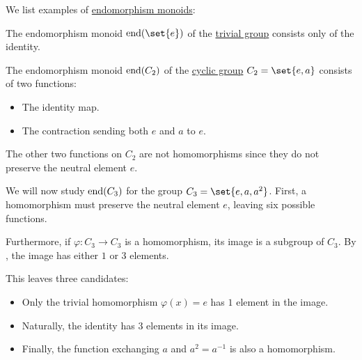 \begin{example}\label{ex:def:endomorphism_monoid}
  We list examples of \hyperref[def:endomorphism_monoid]{endomorphism monoids}:
  \begin{thmenum}
     The endomorphism monoid \( \End(\set{ e }) \) of the \hyperref[def:group/trivial]{trivial group} consists only of the identity.

     The endomorphism monoid \( \operatorname{end}(C_2) \) of the \hyperref[def:cyclic_group]{cyclic group} \( C_2 = \set{ e, a } \) consists of two functions:
    \begin{itemize}
      \item The identity map.
      \item The contraction sending both \( e \) and \( a \) to \( e \).
    \end{itemize}

    The other two functions on \( C_2 \) are not homomorphisms since they do not preserve the neutral element \( e \).

     We will now study \( \operatorname{end}(C_3) \) for the group \( C_3 = \set{ e, a, a^2 } \). First, a homomorphism must preserve the neutral element \( e \), leaving six possible functions.

    Furthermore, if \( \varphi: C_3 \to C_3 \) is a homomorphism, its image is a subgroup of \( C_3 \). By , the image has either \( 1 \) or \( 3 \) elements.

    This leaves three candidates:
    \begin{itemize}
      \item Only the trivial homomorphism \( \varphi(x) = e \) has \( 1 \) element in the image.
      \item Naturally, the identity has \( 3 \) elements in its image.
      \item Finally, the function exchanging \( a \) and \( a^2 = a^{-1} \) is also a homomorphism.
    \end{itemize}
  \end{thmenum}
\end{example}

